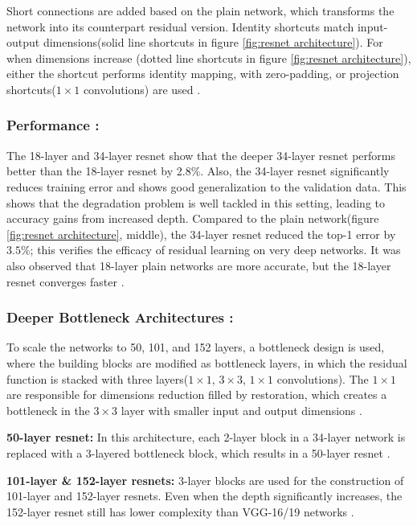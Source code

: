 Short connections are added based on the plain network, which transforms the network into its counterpart residual version. Identity shortcuts match input-output dimensions(solid line shortcuts in figure \ref{fig:resnet architecture}). For when dimensions increase (dotted line shortcuts in figure \ref{fig:resnet architecture}), either the shortcut performs identity mapping, with zero-padding, or projection shortcuts($1\times1$ convolutions) are used \cite{he2016deep}.

\subsubsection*{Performance :}

The 18-layer and 34-layer \gls{resnet} show that the deeper 34-layer \gls{resnet} performs better than the 18-layer \gls{resnet} by 2.8\%. Also, the 34-layer \gls{resnet} significantly reduces training error and shows good generalization to the validation data. This shows that the degradation problem is well tackled in this setting, leading to accuracy gains from increased depth. Compared to the plain network(figure \ref{fig:resnet architecture}, middle), the 34-layer \gls{resnet} reduced the top-1 error by $3.5\%$; this verifies the efficacy of residual learning on very deep networks. It was also observed that 18-layer plain networks are more accurate, but the 18-layer \gls{resnet} converges faster \cite{he2016deep}.

\subsubsection*{Deeper Bottleneck Architectures :}

To scale the networks to 50, 101, and 152 layers, a bottleneck design is used, where the building blocks are modified as bottleneck layers, in which the residual function is stacked with three layers($1\times1$, $3\times3$, $1\times1$ convolutions). The $1\times1$ are responsible for dimensions reduction filled by restoration, which creates a bottleneck in the $3\times3$ layer with smaller input and output dimensions \cite{he2016deep}.

\textbf{50-layer \gls{resnet}:} In this architecture, each 2-layer block in a 34-layer network is replaced with a 3-layered bottleneck block, which results in a 50-layer \gls{resnet} \cite{he2016deep}.

\textbf{101-layer \& 152-layer \glspl{resnet}:} 3-layer blocks are used for the construction of 101-layer and 152-layer \glspl{resnet}. Even when the depth significantly increases, the 152-layer \gls{resnet} still has lower complexity than VGG-16/19 networks \cite{he2016deep}.

